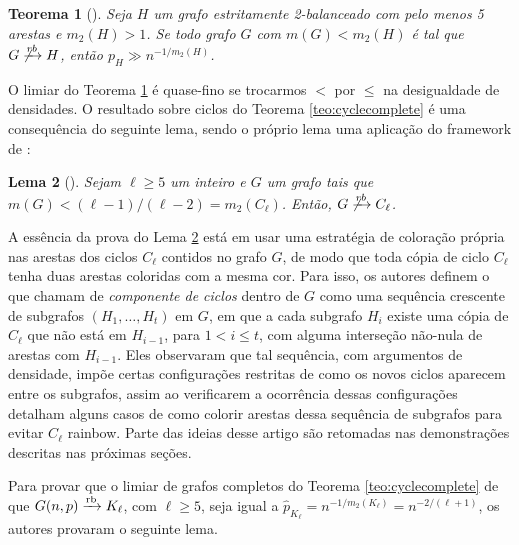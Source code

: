 \documentclass[12pt,a4paper]{book}
\def\rbarrow{\xrightarrow[]{\raisebox{0.0mm}[0mm]{$\scriptstyle \rm rb$}}}
\newtheorem{teorema}{Teorema}[chapter]
\newtheorem{lema}      [teorema] {Lema}
\begin{document}

\begin{teorema}[\cite{behague2024thresholds}]\label{teo:limiar}
    Seja $H$ um grafo estritamente 2-balanceado com pelo menos 5 arestas e $m_2(H) > 1$.
    Se todo grafo $G$ com $m(G) < m_2(H)$ é tal que $G \not\xrightarrow[]{rb} H$, 
    então $p_H \gg n^{-1/m_2(H)}$.
\end{teorema}

O limiar do Teorema \ref{teo:limiar} é quase-fino se trocarmos $<$ por $\leq$ na desigualdade de densidades.
O resultado sobre ciclos do Teorema \ref{teo:cyclecomplete} é uma consequência do seguinte lema, sendo o próprio lema uma aplicação do framework de \cite{NePeSkSt14}:
    
\begin{lema}[\cite{barros2021anti}]\label{lema:rbciclos}
         Sejam $\ell \geq 5$ um inteiro e $G$ um grafo tais que
         ${m(G) < (\ell-1)/(\ell-2) = m_2(C_\ell)}$. 
         Então, $G \not\xrightarrow[]{rb} C_\ell$.
\end{lema}
    
A essência da prova do Lema \ref{lema:rbciclos} está em usar uma estratégia de coloração própria nas arestas dos ciclos $C_\ell$ contidos no grafo $G$, de modo que toda cópia de ciclo $C_\ell$ tenha duas arestas coloridas com a mesma cor.
%
Para isso, os autores definem o que chamam de \emph{componente de ciclos} dentro de $G$ como uma sequência crescente de subgrafos $(H_1, \ldots, H_t)$ em $G$, em que a cada subgrafo $H_{i}$ existe uma cópia de $C_\ell$ que não está em $H_{i-1}$, para ${1 < i \leq t}$, com alguma interseção não-nula de arestas com $H_{i-1}$.
%
Eles observaram que tal sequência, com argumentos de densidade, impõe certas configurações restritas de como os novos ciclos aparecem entre os subgrafos, assim ao verificarem a ocorrência dessas configurações detalham alguns casos de como colorir arestas dessa sequência de subgrafos para evitar $C_\ell$ rainbow.
     Parte das ideias desse artigo são retomadas nas demonstrações descritas nas próximas seções.
 
 
   Para provar que o limiar de grafos completos do Teorema \ref{teo:cyclecomplete} de que $G(n,p) \rbarrow K_\ell$, com $\ell \geq 5$, seja igual a $\hat{p}_{K_\ell} = n^{-1/m_2(K_\ell)} = n^{- 2/(\ell+1)}$, os autores provaram o seguinte lema.
   
\end{document}

